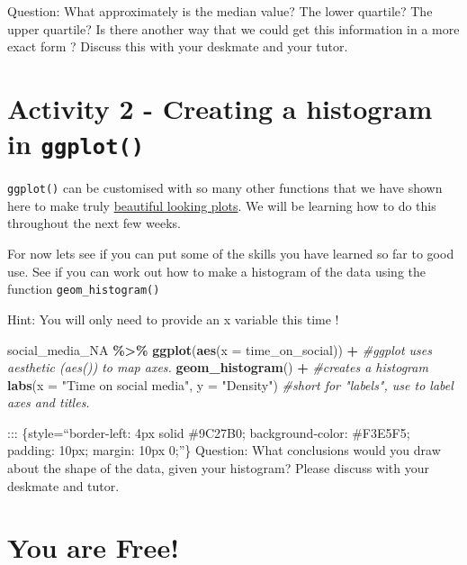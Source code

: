 \documentclass[
]{book}
\newenvironment{Shaded}{\begin{snugshade}}{\end{snugshade}}
\newcommand{\AttributeTok}[1]{\textcolor[rgb]{0.13,0.29,0.53}{#1}}
\newcommand{\CommentTok}[1]{\textcolor[rgb]{0.56,0.35,0.01}{\textit{#1}}}
\newcommand{\FunctionTok}[1]{\textcolor[rgb]{0.13,0.29,0.53}{\textbf{#1}}}
\newcommand{\NormalTok}[1]{#1}
\newcommand{\SpecialCharTok}[1]{\textcolor[rgb]{0.81,0.36,0.00}{\textbf{#1}}}
\newcommand{\StringTok}[1]{\textcolor[rgb]{0.31,0.60,0.02}{#1}}
\begin{document}
Question: What approximately is the median value? The lower quartile? The upper quartile? Is there another way that we could get this information in a more exact form ? Discuss this with your deskmate and your tutor.

\section{\texorpdfstring{Activity 2 - Creating a histogram in \texttt{ggplot()}}{Activity 2 - Creating a histogram in ggplot()}}\label{activity-2---creating-a-histogram-in-ggplot}

\texttt{ggplot()} can be customised with so many other functions that we have shown here to make truly \href{https://r-graph-gallery.com/ggplot2-package.html}{beautiful looking plots}. We will be learning how to do this throughout the next few weeks.

For now lets see if you can put some of the skills you have learned so far to good use. See if you can work out how to make a histogram of the data using the function \texttt{geom\_histogram()}

Hint: You will only need to provide an x variable this time !

\begin{Shaded}
\begin{Highlighting}[]
\NormalTok{social\_media\_NA }\SpecialCharTok{\%\textgreater{}\%}
\FunctionTok{ggplot}\NormalTok{(}\FunctionTok{aes}\NormalTok{(}\AttributeTok{x =}\NormalTok{ time\_on\_social)) }\SpecialCharTok{+} \CommentTok{\#ggplot uses aesthetic (aes()) to map axes. }
  \FunctionTok{geom\_histogram}\NormalTok{() }\SpecialCharTok{+} \CommentTok{\#creates a histogram}
  \FunctionTok{labs}\NormalTok{(}\AttributeTok{x =} \StringTok{"Time on social media"}\NormalTok{, }\AttributeTok{y =} \StringTok{"Density"}\NormalTok{) }\CommentTok{\#short for "labels", use to label axes and titles.}
\end{Highlighting}
\end{Shaded}

::: \{style=``border-left: 4px solid \#9C27B0; background-color: \#F3E5F5; padding: 10px; margin: 10px 0;''\}
Question: What conclusions would you draw about the shape of the data, given your histogram? Please discuss with your deskmate and tutor.

\section{You are Free!}\label{you-are-free-1}
\end{document}
